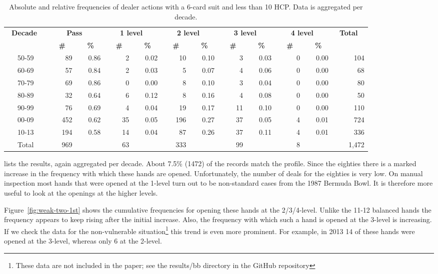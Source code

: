 \documentclass{icga}
\renewcommand{\figref}[1]{Figure~\ref{fig:#1}}
\begin{document}
\begin{table}
\centering\footnotesize
\begin{tabular}{|c|r|r|r|r|r|r|r|r|r|r|r|}
\hline
\bf \ Decade \ & 
\multicolumn{2}{|c|}{\bf \ Pass \ }  &
\multicolumn{2}{|c|}{\bf \ 1 level \ } &
\multicolumn{2}{|c|}{\bf \ 2 level \ } &
\multicolumn{2}{|c|}{\bf \ 3 level \ } &
\multicolumn{2}{|c|}{\bf \ 4 level \ } &
\bf \ Total \  \\ 
\cline{2-11} &
\bf \ \ \# \ &\bf \ \ \% \ &
\bf \ \ \# \ &\bf \ \ \% \ &
\bf \ \ \# \ &\bf \ \ \% \ &
\bf \ \ \# \ &\bf \ \ \% \ &
\bf \ \ \# \ &\bf \ \ \% \ &
\\ \hline\hline
50-59& 89&0.86&2&0.02&10&0.10&3&0.03&0&0.00&104 \\ \hline
60-69& 57&0.84&2&0.03&5&0.07&4&0.06&0&0.00&68 \\ \hline
70-79& 69&0.86&0&0.00&8&0.10&3&0.04&0&0.00&80 \\ \hline
80-89& 32&0.64&6&0.12&8&0.16&4&0.08&0&0.00&50 \\ \hline
90-99&76&0.69&4&0.04&19&0.17&11&0.10&0&0.00&110\\ \hline
00-09&452&0.62&35&0.05&196&0.27&37&0.05&4&0.01&724 \\ \hline 
10-13&194&0.58&14&0.04&87&0.26&37&0.11&4&0.01& 336  \\ \hline
\hline
Total & 969 && 63 && 333 && 99 && 8 && 1,472 \\ \hline 	
\end{tabular}
\caption{Absolute and relative frequencies of dealer actions with a
  6-card suit and less than 10 HCP. Data is aggregated per decade.}
\label{tbl:weak-two-1st}
\end{table}

 lists the results, again aggregated per decade.
About 7.5\% (1472) of the records match the profile. Since the
eighties there is a marked increase in the frequency with which these
hands are opened.  Unfortunately, the number of deals for the eighties
is very low. On manual inspection most hands that were opened at the
1-level turn out to be non-standard cases from the 1987 Bermuda Bowl.
It is therefore more useful to look at the openings at the higher
levels.


\figref{weak-two-1st} shows the cumulative frequencies for opening
these hands at the 2/3/4-level.  Unlike the 11-12 balanced hands the
frequency appears to keep rising after the initial increase.  Also,
the frequency with which such a hand is opened at the 3-level is
increasing. If we check the data for the non-vulnerable
situation\footnote{%
  These data are not included in the paper; see the results/bb directory
  in the GitHub repository} this trend is even more prominent. For
example, in 2013 14 of these hands were opened at the 3-level, whereas
only 6 at the 2-level.
\end{document}

